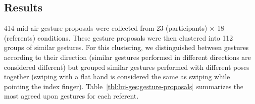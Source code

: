 

\subsection{Results} \label{app:lui-ges:results}
414 mid-air gesture proposals were collected from 23 (participants) $\times$ 18 (referents) conditions. These gesture proposals were then clustered into 112 groups of similar gestures. For this clustering, we distinguished between gestures according to their direction (\ie similar gestures performed in different directions are considered different) but grouped similar gestures performed with different poses together (\eg swiping with a flat hand is considered the same as swiping while pointing the index finger). Table~\ref{tbl:lui-ges:gesture-proposals} summarizes the most agreed upon gestures for each referent.



